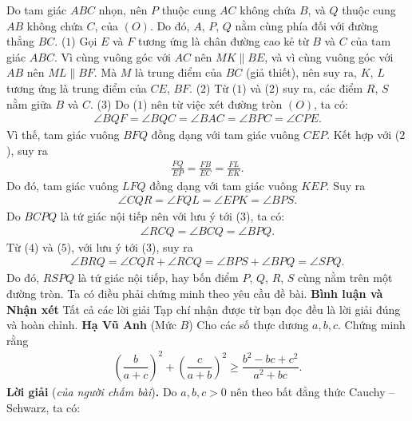 \begin{multicols}{2}
	Do tam giác $ABC$ nhọn, nên $P$ thuộc cung $AC$ không chứa $B$, và $Q$ thuộc cung $AB$ không chứa $C$, của $(O)$. Do đó, $A$, $P$, $Q$ nằm cùng phía đối với đường thẳng $BC$. \hfill ($1$)
	\vskip 0.05cm
	Gọi $E$ và $F$ tương ứng là chân đường cao kẻ từ $B$ và $C$ của tam giác $ABC$.
	\vskip 0.05cm
	Vì cùng vuông góc với $AC$ nên $MK \parallel BE$, và vì cùng vuông góc với $AB$ nên $ML \parallel BF$. Mà $M$ là trung điểm của $BC$ (giả thiết), nên suy ra, $K$, $L$ tương ứng là trung điểm của $CE$, $BF$. \hfill ($2$)
	\vskip 0.05cm
	Từ ($1$) và ($2$) suy ra, các điểm $R$, $S$ nằm giữa $B$ và $C$. \hfill ($3$)
	\vskip 0.05cm
	Do ($1$) nên từ việc xét đường tròn $(O)$, ta có:
	\begin{align*}
		\angle BQF = \angle BQC = \angle BAC = \angle BPC = \angle CPE.
	\end{align*}
	Vì thế, tam giác vuông $BFQ$ đồng dạng với tam giác vuông $CEP$. Kết hợp với ($2$), suy ra
	\begin{align*}
		\frac{{FQ}}{{EP}} = \frac{{FB}}{{EC}} = \frac{{FL}}{{EK}}.
	\end{align*}
	Do đó, tam giác vuông $LFQ$ đồng dạng với tam giác vuông $KEP$. Suy ra
	\begin{align*}
		\angle CQR = \angle FQL = \angle EPK = \angle BPS. \tag{$4$}
	\end{align*}
	Do $BCPQ$ là tứ giác nội tiếp nên với lưu ý tới ($3$), ta có:
	\begin{align*}
		\angle RCQ = \angle BCQ = \angle BPQ. \tag{$5$}
	\end{align*}
	Từ ($4$) và ($5$), với lưu ý tới ($3$), suy ra
	\begin{align*}
		\angle BRQ = \angle CQR + \angle RCQ = \angle BPS + \angle BPQ = \angle SPQ.
	\end{align*}
	Do đó, $RSPQ$ là tứ giác nội tiếp, hay bốn điểm $P$, $Q$, $R$, $S$ cùng nằm trên một đường tròn.
	\vskip 0.05cm
	Ta có điều phải chứng minh theo yêu cầu đề bài.
	\vskip 0.05cm
	\textbf{Bình luận và Nhận xét}
	\vskip 0.05cm
	Tất cả các lời giải Tạp chí nhận được từ bạn đọc đều là lời giải đúng và hoàn chỉnh.
	\vskip 0.05cm
	\hfill \textbf{Hạ Vũ Anh}
	\vskip 0.05cm
	{}
	(Mức $B$) Cho các số thực dương $a,b,c$. Chứng minh rằng
	\begin{align*}
		\left(\dfrac b{a+c}\right)^2+\left(\dfrac{c}{a+b}\right)^2\ge \dfrac{b^2-bc+c^2}{a^2+bc}.
	\end{align*}
	\textbf{Lời giải} (\textit{của người chấm bài})\textbf{.}
	\vskip 0.05cm
	Do $a, b, c > 0$ nên theo bất đẳng thức Cauchy -- Schwarz, ta có:

\end{multicols}
